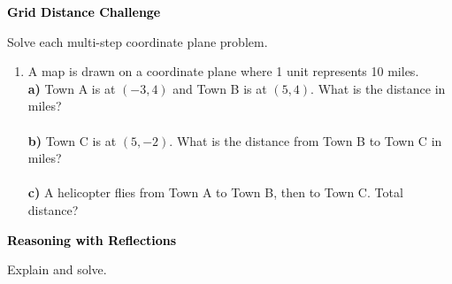 \documentclass[12pt, letterpaper, fleqn]{article}
\begin{document}
\newpage

\begin{tcolorbox}[colback=black!10]
\large\textcolor{black}{\textbf{Grid Distance Challenge}}
\end{tcolorbox}

\noindent
Solve each multi-step coordinate plane problem.

\vspace{3mm}
\begin{enumerate}[itemsep=5cm, leftmargin=0.6cm]
\item A map is drawn on a coordinate plane where 1 unit represents 10 miles. \\ 
\textbf{a)} Town A is at $(-3, 4)$ and Town B is at $(5, 4)$. What is the distance in miles?  \\ \vspace{5cm} \\
\textbf{b)} Town C is at $(5, -2)$. What is the distance from Town B to Town C in miles?  \\ \vspace{5cm} \\
\textbf{c)} A helicopter flies from Town A to Town B, then to Town C. Total distance? \vspace{5cm} \\

\vspace{2cm}

\end{enumerate}

\newpage

\begin{tcolorbox}[colback=black!10]
\large\textcolor{black}{\textbf{Reasoning with Reflections}}
\end{tcolorbox}

\noindent
Explain and solve.
\end{document}
